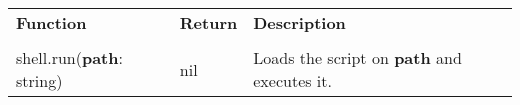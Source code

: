 \begin{tabularx}{\textwidth}{l l X}
	\textbf{\large Function} & \textbf{\large Return} & \textbf{\large Description}
	\\ \\
	\endhead
	shell.run(\textbf{path}: string) & nil & Loads the script on \textbf{path} and executes it.
\end{tabularx}